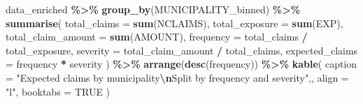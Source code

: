 \documentclass[
  english,
  11pt,
]{article}
\newenvironment{Shaded}{\begin{snugshade}}{\end{snugshade}}
\newcommand{\AttributeTok}[1]{\textcolor[rgb]{0.13,0.29,0.53}{#1}}
\newcommand{\ConstantTok}[1]{\textcolor[rgb]{0.56,0.35,0.01}{#1}}
\newcommand{\FunctionTok}[1]{\textcolor[rgb]{0.13,0.29,0.53}{\textbf{#1}}}
\newcommand{\NormalTok}[1]{#1}
\newcommand{\SpecialCharTok}[1]{\textcolor[rgb]{0.81,0.36,0.00}{\textbf{#1}}}
\newcommand{\StringTok}[1]{\textcolor[rgb]{0.31,0.60,0.02}{#1}}
\begin{document}
\begin{Shaded}
\begin{Highlighting}[]
\NormalTok{data\_enriched }\SpecialCharTok{\%\textgreater{}\%}
    \FunctionTok{group\_by}\NormalTok{(MUNICIPALITY\_binned) }\SpecialCharTok{\%\textgreater{}\%}
    \FunctionTok{summarise}\NormalTok{(}
        \AttributeTok{total\_claims =} \FunctionTok{sum}\NormalTok{(NCLAIMS),}
        \AttributeTok{total\_exposure =} \FunctionTok{sum}\NormalTok{(EXP),}
        \AttributeTok{total\_claim\_amount =} \FunctionTok{sum}\NormalTok{(AMOUNT),}
        \AttributeTok{frequency =}\NormalTok{ total\_claims }\SpecialCharTok{/}\NormalTok{ total\_exposure,}
        \AttributeTok{severity =}\NormalTok{ total\_claim\_amount }\SpecialCharTok{/}\NormalTok{ total\_claims,}
        \AttributeTok{expected\_claims =}\NormalTok{ frequency }\SpecialCharTok{*}\NormalTok{ severity}
\NormalTok{    ) }\SpecialCharTok{\%\textgreater{}\%}
    \FunctionTok{arrange}\NormalTok{(}\FunctionTok{desc}\NormalTok{(frequency)) }\SpecialCharTok{\%\textgreater{}\%}
    \FunctionTok{kable}\NormalTok{(}
        \AttributeTok{caption =} \StringTok{"Expected claims by municipality}\SpecialCharTok{\textbackslash{}n}\StringTok{Split by frequency and severity"}\NormalTok{,,}
        \AttributeTok{align =} \StringTok{"l"}\NormalTok{, }\AttributeTok{booktabs =} \ConstantTok{TRUE}
\NormalTok{    )}
\end{Highlighting}
\end{Shaded}
\end{document}
